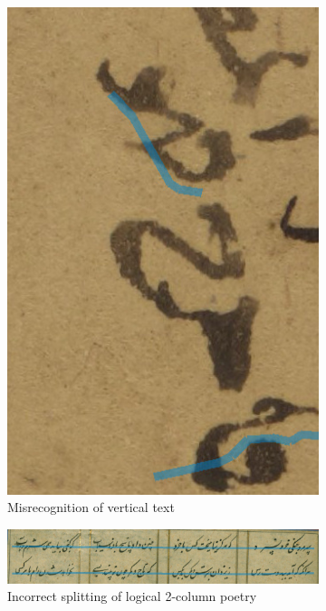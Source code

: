 \begin{figure}[ht!]
\begin{subfigure}[t]{.475\columnwidth}
		\includegraphics[width=\textwidth]{fail_vert.jpg}
		\caption{Misrecognition of vertical text}
		\label{fig:vert}
	\end{subfigure}
	\begin{subfigure}[b]{\columnwidth}
		\includegraphics[width=\textwidth]{fail_4col.jpg}
		\caption{Incorrect splitting of logical 2-column poetry}
		\label{fig:4col}
	\end{subfigure}
	\begin{subfigure}[b]{\columnwidth}

\end{subfigure}
\end{figure}
